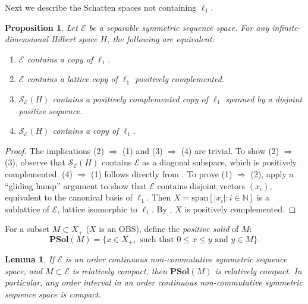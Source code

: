 \documentclass[12pt]{amsart}
\theoremstyle{plain}
\newtheorem{lemma}[theorem]{Lemma}
\newtheorem{proposition}[theorem]{Proposition}
\theoremstyle{definition}
\newcommand{\N}{\mathbb N}
\newcommand{\ce}{\mathcal E}
\newcommand{\se}{{\mathcal S}_{\mathcal{E}}}
\newcommand{\psol}{\mathbf{PSol}}
\renewcommand{\span}{\mathrm{span}}
\begin{document}
Next we describe the Schatten spaces not containing $\ell_1$.

\begin{proposition}\label{prop:l_1_S_E_cont}
Let $\ce$ be a separable symmetric sequence space.
For any infinite-dimensional Hilbert space $H$,
the following are equivalent:
\begin{enumerate}
\item $\ce$ contains a copy of $\ell_1$.
\item $\ce$ contains a lattice copy of $\ell_1$ positively complemented.
\item $\se(H)$ contains a positively complemented copy of $\ell_1$ spanned
by a disjoint positive sequence.
\item $\se(H)$ contains a copy of $\ell_1$.
\end{enumerate}
\end{proposition}

\begin{proof}
The implications (2) $\Rightarrow$ (1) and
(3)  $\Rightarrow$ (4) are trivial.
To show (2) $\Rightarrow$ (3), observe that $\se(H)$ contains $\ce$
as a diagonal subspace, which is positively complemented.
(4) $\Rightarrow$ (1) follows directly from \cite[Corollary 3.2]{Ar}.
To prove (1) $\Rightarrow$ (2), apply a
``gliding hump'' argument to show that $\ce$ contains disjoint vectors
$(x_i)$, equivalent to the canonical basis of $\ell_1$.
Then $X = \span[|x_i| : i \in \N]$ is a sublattice of $\ce$,
lattice isomorphic to $\ell_1$. By \cite[Theorem 2.3.11]{M-N},
$X$ is positively complemented.
\end{proof}


For a subset $M \subset  X_{+}$ ($X$ is an OBS), define 
the \emph{positive solid} of $M$:
 $$\psol(M)=\{ x \in X_{+},\text{ such that } 0\le x \le y \text{ and } y \in M\}.$$

\begin{lemma}\label{lem:psol comp}
If $\ce$ is an order continuous non-commutative symmetric sequence space,
and $M \subset \ce$ is relatively compact, then $\psol(M)$ is relatively compact.
In particular, any order interval in an order continuous non-commu\-ta\-tive symmetric
sequence space is compact.
\end{lemma}
\end{document}
